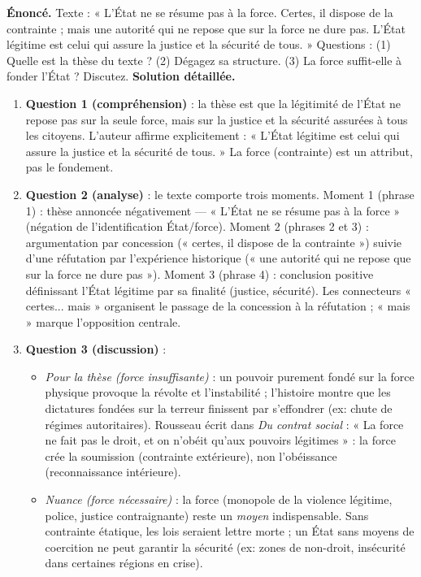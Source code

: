 \documentclass[11pt]{article}
\newcommand{\cle}[1]{{\popxbold\color{popdark}#1}}
\begin{document}
\begin{exoresolu}
\textbf{Énoncé.} Texte : « L'État ne se résume pas à la force. Certes, il dispose de la contrainte ; mais une autorité qui ne repose que sur la force ne dure pas. L'État légitime est celui qui assure la justice et la sécurité de tous. » Questions : (1) Quelle est la thèse du texte ? (2) Dégagez sa structure. (3) La force suffit-elle à fonder l'État ? Discutez.
\tcblower
\textbf{Solution détaillée.}
\begin{enumerate}
\item \textbf{Question 1 (compréhension)} : la thèse est que la légitimité de l'État ne repose pas sur la seule force, mais sur la justice et la sécurité assurées à tous les citoyens. L'auteur affirme explicitement : « L'État légitime est celui qui assure la justice et la sécurité de tous. » La force (contrainte) est un attribut, pas le fondement.
\item \textbf{Question 2 (analyse)} : le texte comporte trois moments. Moment 1 (phrase 1) : thèse annoncée négativement — « L'État ne se résume pas à la force » (négation de l'identification État/force). Moment 2 (phrases 2 et 3) : argumentation par \cle{concession} (« certes, il dispose de la contrainte ») suivie d'une \cle{réfutation} par l'expérience historique (« une autorité qui ne repose que sur la force ne dure pas »). Moment 3 (phrase 4) : conclusion positive définissant l'État légitime par sa finalité (justice, sécurité). Les connecteurs « certes... mais » organisent le passage de la concession à la réfutation ; « mais » marque l'opposition centrale.
\item \textbf{Question 3 (discussion)} :
\begin{itemize}
\item \emph{Pour la thèse (force insuffisante)} : un pouvoir purement fondé sur la force physique provoque la révolte et l'instabilité ; l'histoire montre que les dictatures fondées sur la terreur finissent par s'effondrer (ex: chute de régimes autoritaires). Rousseau écrit dans \emph{Du contrat social} : « La force ne fait pas le droit, et on n'obéit qu'aux pouvoirs légitimes » : la force crée la soumission (contrainte extérieure), non l'obéissance (reconnaissance intérieure).
\item \emph{Nuance (force nécessaire)} : la force (monopole de la violence légitime, police, justice contraignante) reste un \emph{moyen} indispensable. Sans contrainte étatique, les lois seraient lettre morte ; un État sans moyens de coercition ne peut garantir la sécurité (ex: zones de non-droit, insécurité dans certaines régions en crise).

\end{itemize}
\end{enumerate}
\end{exoresolu}
\end{document}
